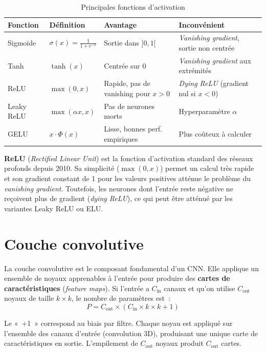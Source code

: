 \documentclass[a4paper,11pt,twoside]{book}
\begin{document}
\begin{table}[H]
\centering
\caption{Principales fonctions d'activation}
\begin{tabularx}{\textwidth}{l l l X}
\toprule
\textbf{Fonction} & \textbf{Définition} & \textbf{Avantage} & \textbf{Inconvénient} \\
\midrule
Sigmoïde & $\sigma(x) = \frac{1}{1+e^{-x}}$ & Sortie dans $]0,1[$ & \textit{Vanishing gradient}, sortie non centrée \\
Tanh & $\tanh(x)$ & Centrée sur 0 & \textit{Vanishing gradient} aux extrémités \\
ReLU & $\max(0, x)$ & Rapide, pas de vanishing pour $x>0$ & \textit{Dying ReLU} (gradient nul si $x<0$) \\
Leaky ReLU & $\max(\alpha x, x)$ & Pas de neurones morts & Hyperparamètre $\alpha$ \\
GELU & $x \cdot \Phi(x)$ & Lisse, bonnes perf. empiriques & Plus coûteux à calculer \\
\bottomrule
\end{tabularx}
\end{table}

\textbf{ReLU} (\textit{Rectified Linear Unit}) est la fonction d'activation standard des réseaux profonds depuis 2010. Sa simplicité ($\max(0, x)$) permet un calcul très rapide et son gradient constant de 1 pour les valeurs positives atténue le problème du \textit{vanishing gradient}. Toutefois, les neurones dont l'entrée reste négative ne reçoivent plus de gradient (\textit{dying ReLU}), ce qui peut être atténué par les variantes Leaky ReLU ou ELU.

\section{Couche convolutive}

La couche convolutive est le composant fondamental d'un CNN. Elle applique un ensemble de noyaux apprenables à l'entrée pour produire des \textbf{cartes de caractéristiques} (\textit{feature maps}). Si l'entrée a $C_\text{in}$ canaux et qu'on utilise $C_\text{out}$ noyaux de taille $k \times k$, le nombre de paramètres est~:
\[
P = C_\text{out} \times (C_\text{in} \times k \times k + 1)
\]

Le «~+1~» correspond au biais par filtre. Chaque noyau est appliqué sur l'ensemble des canaux d'entrée (convolution 3D), produisant une unique carte de caractéristiques en sortie. L'empilement de $C_\text{out}$ noyaux produit $C_\text{out}$ cartes.
\end{document}
